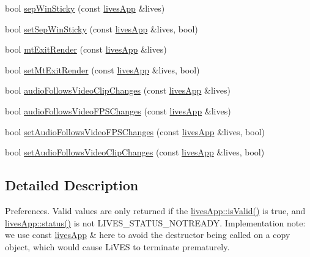 \begin{DoxyCompactItemize}
\item 
bool \hyperlink{namespacelives_1_1prefs_af65cac20915b2cbdfbded62f649b4efd}{sep\-Win\-Sticky} (const \hyperlink{classlives_1_1livesApp}{lives\-App} \&lives)
\item 
bool \hyperlink{namespacelives_1_1prefs_a693a8c834571488713a338edca18cc66}{set\-Sep\-Win\-Sticky} (const \hyperlink{classlives_1_1livesApp}{lives\-App} \&lives, bool)
\item 
bool \hyperlink{namespacelives_1_1prefs_a47055c8f50d9191d66337e53eb447c9f}{mt\-Exit\-Render} (const \hyperlink{classlives_1_1livesApp}{lives\-App} \&lives)
\item 
bool \hyperlink{namespacelives_1_1prefs_a84b0f6b47b008696d236c06c4a277867}{set\-Mt\-Exit\-Render} (const \hyperlink{classlives_1_1livesApp}{lives\-App} \&lives, bool)
\item 
bool \hyperlink{namespacelives_1_1prefs_aea0e2ef16f2d3af5478a005923f0bcf5}{audio\-Follows\-Video\-Clip\-Changes} (const \hyperlink{classlives_1_1livesApp}{lives\-App} \&lives)
\item 
bool \hyperlink{namespacelives_1_1prefs_a60f9b6187ab68e0bfabf3bb6a613710e}{audio\-Follows\-Video\-F\-P\-S\-Changes} (const \hyperlink{classlives_1_1livesApp}{lives\-App} \&lives)
\item 
bool \hyperlink{namespacelives_1_1prefs_a75144d61799c556862c164761129c637}{set\-Audio\-Follows\-Video\-F\-P\-S\-Changes} (const \hyperlink{classlives_1_1livesApp}{lives\-App} \&lives, bool)
\item 
bool \hyperlink{namespacelives_1_1prefs_a5d3ce19bb1b262849103bfb65dcf2e88}{set\-Audio\-Follows\-Video\-Clip\-Changes} (const \hyperlink{classlives_1_1livesApp}{lives\-App} \&lives, bool)
\end{DoxyCompactItemize}


\subsection{Detailed Description}
Preferences. Valid values are only returned if the \hyperlink{classlives_1_1livesApp_a909c5e836672f9e1caee66912830ab60}{lives\-App\-::is\-Valid()} is true, and \hyperlink{classlives_1_1livesApp_afcb05464af9146f5efbb896f2611c8e7}{lives\-App\-::status()} is not L\-I\-V\-E\-S\-\_\-\-S\-T\-A\-T\-U\-S\-\_\-\-N\-O\-T\-R\-E\-A\-D\-Y. Implementation note\-: we use const \hyperlink{classlives_1_1livesApp}{lives\-App} \& here to avoid the destructor being called on a copy object, which would cause Li\-V\-E\-S to terminate prematurely. 


